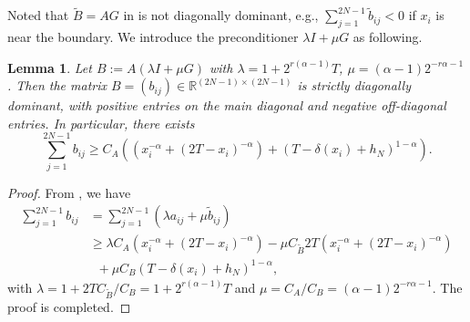 \documentclass{amsart}
\newtheorem{lemma}[theorem]{Lemma}
\theoremstyle{definition}
\theoremstyle{remark}
\numberwithin{equation}{section}
\begin{document}
Noted that $\tilde{B}=AG$ in  is not diagonally dominant, e.g., 
$\sum_{j=1}^{2N-1} \tilde{b}_{ij} < 0 $ if $x_i$ is near the boundary.
We introduce the preconditioner $\lambda I + \mu G$ as following.
\begin{lemma}\label{thm:ALGisM}
  Let \(B := A(\lambda I+\mu G)\) 
    with $\lambda= 1+ 2^{r(\alpha-1)} T $, $\mu = (\alpha-1)2^{-r\alpha-1}$. 
  Then the matrix $B = (b_{ij})\in \mathbb{R}^{(2N-1) \times (2N-1)}$ is strictly diagonally dominant, with positive entries on the main diagonal and negative off-diagonal entries.
  In particular, there exists
  \begin{equation*}
    \sum_{j=1}^{2N-1} b_{ij} \ge C_A \left( (x_i^{-\alpha} + (2T-x_i)^{-\alpha}) + (T - \delta(x_{i}) + h_N)^{1-\alpha} \right).
  \end{equation*}
\end{lemma}
\begin{proof}
  From , we have 
  \begin{equation*}
      \begin{aligned}
          \sum_{j=1}^{2N-1} b_{ij} &= \sum_{j=1}^{2N-1} \left(\lambda a_{ij} + \mu \tilde{b}_{ij} \right) \\
           & \ge \lambda C_A \left( x_i^{-\alpha} + (2T-x_i)^{-\alpha} \right)
            - \mu C_{\tilde{B}} 2T \left( x_i^{-\alpha} + (2T-x_i)^{-\alpha} \right) \\
           & \;\; + \mu C_B \left( T-\delta(x_i) + h_N \right)^{1-\alpha},
      \end{aligned}
  \end{equation*}
  with \(\lambda = 1+2T C_{\tilde{B}} / C_B = 1+ 2^{r(\alpha-1)} T\) and \(\mu= C_A/C_B = (\alpha-1)2^{-r\alpha-1} \).
  The proof is completed.
\end{proof}
\end{document}

